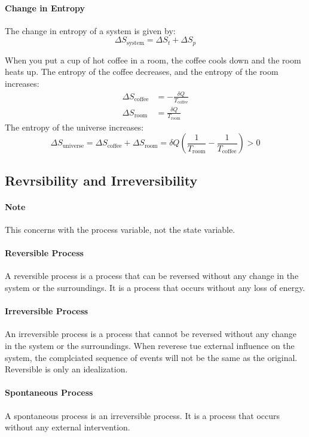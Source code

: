 \documentclass[11pt]{article}
\begin{document}
\paragraph{Change in Entropy} The change in entropy of a system is given by:
\begin{equation}
    \Delta S_{\text{system}} = \Delta S_t + \Delta S_{p}
\end{equation}
\begin{example}
    When you put a cup of hot coffee in a room, the coffee cools down and the room heats up. The entropy of the coffee decreases, and the entropy of the room increases:
    \begin{align*}
        \Delta S_{\text{coffee}} &= -\frac{\delta Q}{T_{\text{coffee}}} \\
        \Delta S_{\text{room}} &= \frac{\delta Q}{T_{\text{room}}}
    \end{align*}
    The entropy of the universe increases:
    $$
    \Delta S_{\text{universe}} = \Delta S_{\text{coffee}} + \Delta S_{\text{room}} = \delta Q(\frac{1}{T_{\text{room}}} - \frac{1}{T_{\text{coffee}}}) > 0
    $$
\end{example}
\subsection{Revrsibility and Irreversibility}
\paragraph{Note} This concerns with the process variable, not the state variable.
\paragraph{Reversible Process} A reversible process is a process that can be reversed without any change in the system or the surroundings. It is a process that occurs without any loss of energy.
\paragraph{Irreversible Process} An irreversible process is a process that cannot be reversed without any change in the system or the surroundings. When reverese tue external influence on the system, the complciated sequence of events will not be the same as the original. Reversible is only an idealization.
\paragraph{Spontaneous Process} A spontaneous process is an irreversible process. It is a process that occurs without any external intervention.
\end{document}

